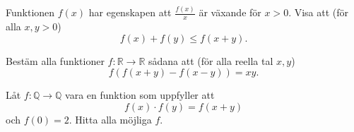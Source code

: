 \begin{problem}
	Funktionen \(f(x)\) har egenskapen att \(\frac{f(x)}{x} \) är växande för \(x>0\). Visa att (för alla \(x, y > 0\))
	\[
		f(x) + f(y) \leq f(x+y).
	\]
\end{problem}

\begin{problem}
	Bestäm alla funktioner \(f: \mathbb{R} \rightarrow \mathbb{R} \) sådana att (för alla reella tal \(x, y\))
	\[
		f(f(x+y) - f(x-y)) = xy.
	\]
\end{problem}

\begin{problem}
	Låt \(f: \mathbb{Q} \rightarrow \mathbb{Q} \) vara en funktion som uppfyller att
	\[
		f(x) \cdot f(y)=f(x+y)
	\]
	och \(f(0) =2\). Hitta alla möjliga \(f\).
\end{problem}


